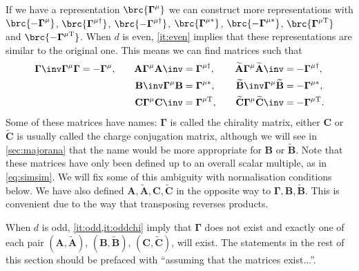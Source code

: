\documentclass[11pt]{article}
\newcommand{\Gammab}{\boldsymbol{\Gamma}}
\newcommand{\mud}{{\mu\dag}}
\newcommand{\mut}{{\mu\mathrm{T}}}
\newcommand{\muc}{{\mu\ast}}
\newcommand{\A}{\mathbf{A}}
\newcommand{\B}{\mathbf{B}}
\renewcommand{\C}{\mathbf{C}}
\newcommand{\At}{\widetilde{\mathbf{A}}}
\newcommand{\Bt}{\widetilde{\mathbf{B}}}
\newcommand{\Ct}{\widetilde{\mathbf{C}}}
\begin{document}
If we have a representation $\brc{\Gammab^\mu}$ we can construct more representations with $\brc{-\Gammab^\mu}$, $\brc{\Gammab^\mud}$, $\brc{-\Gammab^\mud}$, $\brc{\Gammab^\muc}$, $\brc{-\Gammab^\muc}$, $\brc{\Gammab^\mut}$ and $\brc{-\Gammab^\mut}$.
When $d$ is even, \cref{it:even} implies that these representations are similar to the original one.
This means we can find matrices such that
%
\begin{equation}\label{eq:cccmats}
\begin{aligned}
  \Gammab\inv \Gammab^\mu \Gammab &= -\Gammab^\mu, &\quad
  \A  \Gammab^\mu \A\inv  &=  \Gammab^\mud, &\quad
  \At \Gammab^\mu \At\inv &= -\Gammab^\mud, \\ &&
  \B\inv  \Gammab^\mu \B  &=  \Gammab^\muc, &
  \Bt\inv \Gammab^\mu \Bt &= -\Gammab^\muc, \\ &&
  \C  \Gammab^\mu \C\inv  &=  \Gammab^\mut, &
  \Ct \Gammab^\mu \Ct\inv &= -\Gammab^\mut.
\end{aligned}
\end{equation}
%
Some of these matrices have names: $\Gammab$ is called the chirality matrix, either $\C$ or $\Ct$ is usually called the charge conjugation matrix, although we will see in \cref{sec:majorana} that the name would be more appropriate for $\B$ or $\Bt$.
Note that these matrices have only been defined up to an overall scalar multiple, as in \cref{eq:simsim}.
We will fix some of this ambiguity with normalisation conditions below.
We have also defined $\A,\At,\C,\Ct$ in the opposite way to $\Gammab,\B,\Bt$.
This is convenient due to the way that transposing reverses products.

When $d$ is odd, \cref{it:odd,it:oddchi} imply that $\Gammab$ does not exist and exactly one of each pair $(\A, \At)$, $(\B, \Bt)$, $(\C, \Ct)$, will exist.
The statements in the rest of this section should be prefaced with ``assuming that the matrices exist...''.
\end{document}
